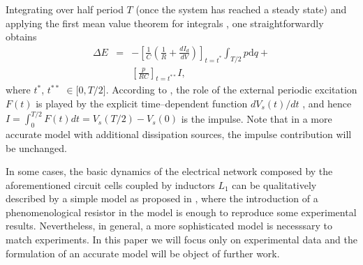 \documentclass[showpacs,preprintnumbers,10pt,onecolumn]{revtex4}%
\begin{document}
Integrating over half  period $T$ (once the system has reached a steady state) and applying
the first mean value theorem for integrals \cite{6,7}, one straightforwardly
obtains
\begin{eqnarray}
\Delta E  & = & -\left[\frac{1}{C}\left(  \frac{1}{R}+\frac{dI_{d}}{dV}\right)  \right]  _{t=t^{\ast}} \int_{T/2} p \mathrm{d} q%
+\nonumber\label{deltaE}\\
&  & \left[  \frac{p}{RC}\right]  _{t=t^{\ast
\ast}}I,
\end{eqnarray}
where $t^{\ast}$, $t^{\ast\ast}$ $\in\lbrack0,T/2]$. According to \cite{CCP16}, the role  of the external periodic excitation $F(t)$ is played by the explicit time--dependent
function $dV_s(t)/dt$
, and hence $I=\int_{0}^{T/2}F(t)dt=V_s(T/2)-V_s(0)$ is the impulse. Note that in a more accurate model with additional dissipation
sources, the impulse contribution will be unchanged.

In some cases, the basic dynamics of the electrical
network composed by the aforementioned circuit cells coupled by inductors
$L_{1}$ can be qualitatively described by a simple model as proposed in \cite{electric1, electric2}, where the introduction of a phenomenological
resistor in the model is enough to reproduce some experimental results. Nevertheless, in general,  a more sophisticated
model is necesssary to match experiments. In this paper we will focus only
on experimental data and the formulation of an accurate model will be object of further work.
\end{document}
